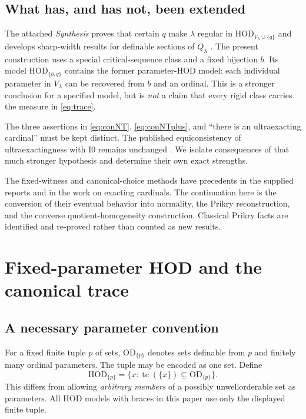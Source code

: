 \documentclass[11pt,letterpaper]{article}
\theoremstyle{definition}
\numberwithin{equation}{section}
\newcommand{\HOD}{\mathrm{HOD}}
\newcommand{\OD}{\mathrm{OD}}
\newcommand{\Izero}{\mathrm{I0}}
\newcommand{\tc}{\operatorname{tc}}
\newcommand{\ODp}{\OD_{\{p\}}}
\newcommand{\HODp}{\HOD_{\{p\}}}
\begin{document}
\subsection{What has, and has not, been extended}

The attached \emph{Synthesis} proves that certain $q$ make $\lambda$
regular in $\HOD_{V_\lambda\cup\{q\}}$ and develops sharp-width results
for definable sections of $Q_\lambda$ \cite{source-synthesis}. The
present construction uses a special critical-sequence class and a fixed
bijection $b$. Its model $\HOD_{\{b,q\}}$ contains the former
parameter-HOD model: each individual parameter in $V_\lambda$ can be
recovered from $b$ and an ordinal. This is a stronger conclusion for a
specified model, but is \emph{not} a claim that every rigid class carries
the measure in \eqref{eq:trace}.

The three assertions in \eqref{eq:conNT}, \eqref{eq:conNTplus}, and
``there is an ultraexacting cardinal'' must be kept distinct. The
published equiconsistency of ultraexactingness with $\Izero$ remains
unchanged \cite[Theorem~4.5]{abgl}. We isolate consequences of that much
stronger hypothesis and determine their own exact strengths.

The fixed-witness and canonical-choice methods have precedents in the
supplied reports and in the work on exacting cardinals. The continuation
here is the conversion of their eventual behavior into normality, the
Prikry reconstruction, and the converse quotient-homogeneity
construction. Classical Prikry facts are identified and re-proved rather
than counted as new results.

\section{Fixed-parameter HOD and the canonical trace}\label{sec:hod}

\subsection{A necessary parameter convention}

For a fixed finite tuple $p$ of sets, $\ODp$ denotes sets definable from
$p$ and finitely many ordinal parameters. The tuple may be encoded as
one set. Define
\[
 \HODp=\{x:\tc(\{x\})\subseteq\ODp\}.
\]
This differs from allowing \emph{arbitrary members} of a possibly
unwellorderable set as parameters. All HOD models with braces in this
paper use only the displayed finite tuple.
\end{document}
